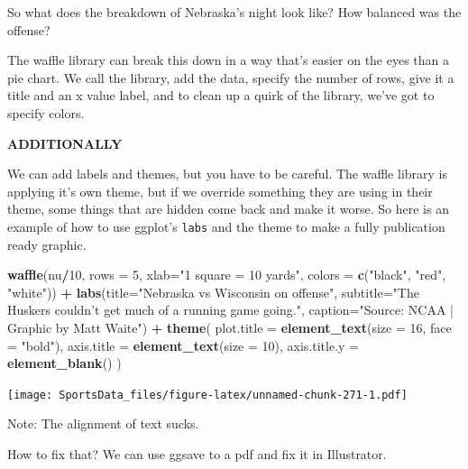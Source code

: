 \documentclass[]{book}
\newenvironment{Shaded}{\begin{snugshade}}{\end{snugshade}}
\newcommand{\DataTypeTok}[1]{\textcolor[rgb]{0.13,0.29,0.53}{#1}}
\newcommand{\DecValTok}[1]{\textcolor[rgb]{0.00,0.00,0.81}{#1}}
\newcommand{\KeywordTok}[1]{\textcolor[rgb]{0.13,0.29,0.53}{\textbf{#1}}}
\newcommand{\NormalTok}[1]{#1}
\newcommand{\OperatorTok}[1]{\textcolor[rgb]{0.81,0.36,0.00}{\textbf{#1}}}
\newcommand{\StringTok}[1]{\textcolor[rgb]{0.31,0.60,0.02}{#1}}
\begin{document}
So what does the breakdown of Nebraska's night look like? How balanced was the offense?

The waffle library can break this down in a way that's easier on the eyes than a pie chart. We call the library, add the data, specify the number of rows, give it a title and an x value label, and to clean up a quirk of the library, we've got to specify colors.

\textbf{ADDITIONALLY}

We can add labels and themes, but you have to be careful. The waffle library is applying it's own theme, but if we override something they are using in their theme, some things that are hidden come back and make it worse. So here is an example of how to use ggplot's \texttt{labs} and the theme to make a fully publication ready graphic.

\begin{Shaded}
\begin{Highlighting}[]
\KeywordTok{waffle}\NormalTok{(nu}\OperatorTok{/}\DecValTok{10}\NormalTok{, }\DataTypeTok{rows =} \DecValTok{5}\NormalTok{, }\DataTypeTok{xlab=}\StringTok{"1 square = 10 yards"}\NormalTok{, }\DataTypeTok{colors =} \KeywordTok{c}\NormalTok{(}\StringTok{"black"}\NormalTok{, }\StringTok{"red"}\NormalTok{, }\StringTok{"white"}\NormalTok{)) }\OperatorTok{+}\StringTok{ }\KeywordTok{labs}\NormalTok{(}\DataTypeTok{title=}\StringTok{"Nebraska vs Wisconsin on offense"}\NormalTok{, }\DataTypeTok{subtitle=}\StringTok{"The Huskers couldn't get much of a running game going."}\NormalTok{, }\DataTypeTok{caption=}\StringTok{"Source: NCAA | Graphic by Matt Waite"}\NormalTok{) }\OperatorTok{+}\StringTok{ }
\StringTok{  }\KeywordTok{theme}\NormalTok{(}
    \DataTypeTok{plot.title =} \KeywordTok{element_text}\NormalTok{(}\DataTypeTok{size =} \DecValTok{16}\NormalTok{, }\DataTypeTok{face =} \StringTok{"bold"}\NormalTok{),}
    \DataTypeTok{axis.title =} \KeywordTok{element_text}\NormalTok{(}\DataTypeTok{size =} \DecValTok{10}\NormalTok{),}
    \DataTypeTok{axis.title.y =} \KeywordTok{element_blank}\NormalTok{()}
\NormalTok{  )}
\end{Highlighting}
\end{Shaded}

\texttt{[image: SportsData\_files/figure-latex/unnamed-chunk-271-1.pdf]}

Note: The alignment of text sucks.

How to fix that? We can use ggsave to a pdf and fix it in Illustrator.
\end{document}
